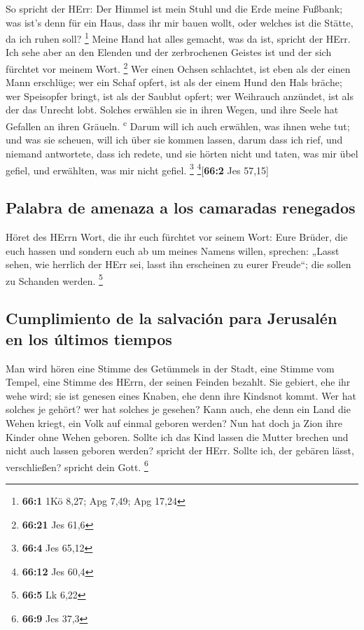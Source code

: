  So spricht der HErr: Der Himmel ist mein Stuhl und die
Erde meine Fußbank; was ist's denn für ein Haus, dass ihr mir bauen
wollt, oder welches ist die Stätte, da ich ruhen soll? \footnote{\textbf{66:1}
  1Kö 8,27; Apg 7,49; Apg 17,24}  Meine Hand hat alles
gemacht, was da ist, spricht der HErr. Ich sehe aber an den Elenden und
der zerbrochenen Geistes ist und der sich fürchtet vor meinem Wort.
\footnote{\textbf{66:21} Jes 61,6}  Wer einen Ochsen
schlachtet, ist eben als der einen Mann erschlüge; wer ein Schaf opfert,
ist als der einem Hund den Hals bräche; wer Speisopfer bringt, ist als
der Saublut opfert; wer Weihrauch anzündet, ist als der das Unrecht
lobt. Solches erwählen sie in ihren Wegen, und ihre Seele hat Gefallen
an ihren Gräueln. \textsuperscript{c}  Darum will ich auch
erwählen, was ihnen wehe tut; und was sie scheuen, will ich über sie
kommen lassen, darum dass ich rief, und niemand antwortete, dass ich
redete, und sie hörten nicht und taten, was mir übel gefiel, und
erwählten, was mir nicht gefiel. \footnote{\textbf{66:4} Jes 65,12}
\footnote{\textbf{66:12} Jes 60,4}{[}\textbf{66:2} Jes 57,15{]}

\hypertarget{palabra-de-amenaza-a-los-camaradas-renegados}{%
\subsection{Palabra de amenaza a los camaradas
renegados}\label{palabra-de-amenaza-a-los-camaradas-renegados}}

 Höret des HErrn Wort, die ihr euch fürchtet vor seinem
Wort: Eure Brüder, die euch hassen und sondern euch ab um meines Namens
willen, sprechen: „Lasst sehen, wie herrlich der HErr sei, lasst ihn
erscheinen zu eurer Freude``; die sollen zu Schanden werden. \footnote{\textbf{66:5}
  Lk 6,22}

\hypertarget{cumplimiento-de-la-salvaciuxf3n-para-jerusaluxe9n-en-los-uxfaltimos-tiempos}{%
\subsection{Cumplimiento de la salvación para Jerusalén en los últimos
tiempos}\label{cumplimiento-de-la-salvaciuxf3n-para-jerusaluxe9n-en-los-uxfaltimos-tiempos}}

 Man wird hören eine Stimme des Getümmels in der Stadt,
eine Stimme vom Tempel, eine Stimme des HErrn, der seinen Feinden
bezahlt.  Sie gebiert, ehe ihr wehe wird; sie ist genesen
eines Knaben, ehe denn ihre Kindsnot kommt.  Wer hat
solches je gehört? wer hat solches je gesehen? Kann auch, ehe denn ein
Land die Wehen kriegt, ein Volk auf einmal geboren werden? Nun hat doch
ja Zion ihre Kinder ohne Wehen geboren.  Sollte ich das
Kind lassen die Mutter brechen und nicht auch lassen geboren werden?
spricht der HErr. Sollte ich, der gebären lässt, verschließen? spricht
dein Gott. \footnote{\textbf{66:9} Jes 37,3}

